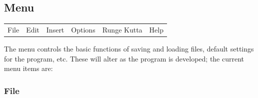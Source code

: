 \subsection{Menu}

\label{Menu}

\begin{tabular}{llllll}
File  & Edit  & Insert  & Options  & Runge Kutta  & Help \tabularnewline
\end{tabular}

The menu controls the basic functions of saving and loading files,
default settings for the program, etc. These will alter as the program
is developed; the current menu items are:

\subsubsection{File}

